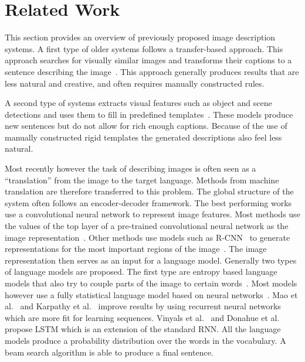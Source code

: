 \documentclass[twoside,twocolumn]{article}
\begin{document}
	\section{Related Work}
	\label{sec:related}
	This section provides an overview of previously proposed image description systems.
	A first type of older systems follows a transfer-based approach. This approach searches for visually similar images and transforms their captions to a sentence describing the image~\cite{Devlin2015a,Hodosh2013,Kuznetsova2012,Ordonez2011}.
	This approach generally produces results that are less natural and creative, and often requires manually constructed rules.
	
	A second type of systems extracts visual features such as object and scene detections and uses them to fill in predefined templates~\cite{Farhadi2010,Mitchell2012,Yang2011}. These models produce new sentences but do not allow for rich enough captions.
	Because of the use of manually constructed rigid templates the generated descriptions also feel less natural. 
	
	Most recently however the task of describing images is often seen as a  ``translation'' from the image to the target language.
	Methods from machine translation are therefore transferred to this problem. The global structure of the system often follows an encoder-decoder framework.
	The best performing works use a convolutional neural network to represent image features. Most methods use the values of the top layer of a pre-trained convolutional neural network as the image representation~\cite{Donahue2015,Mao2014a,Karpathy2015,Google}. Other methods use models such as R-CNN~\cite{Girshick2014} to generate representations for the most important regions of the image~\cite{Jin2015,Mitchell2015}.
	The image representation then serves as an input for a language model.
	Generally two types of language models are proposed. The first type are entropy based language models that also try to couple parts of the image to certain words~\cite{Lebret2015,Mitchell2015}. Most models however use a fully statistical language model based on neural networks~\cite{Kiros2013}. Mao et al.~\cite{Mao2014a} and Karpathy et al.~\cite{Karpathy2015} improve results by using recurrent neural networks which are more fit for learning sequences. Vinyals et al.~\cite{Google} and Donahue et al.~\cite{Donahue2015} propose LSTM which is an extension of the standard RNN.
	All the language models produce a probability distribution over the words in the vocabulary. A beam search algorithm is able to produce a final sentence.
	
\end{document}
